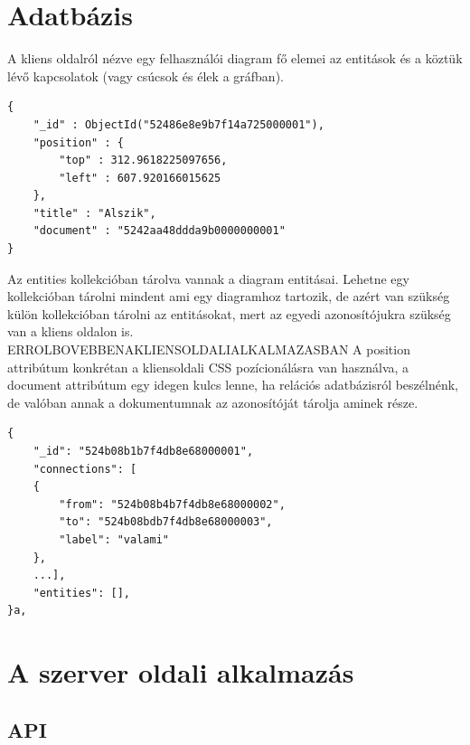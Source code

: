 \section{Adatbázis}

A kliens oldalról nézve egy felhasználói diagram fő elemei az entitások és a köztük lévő kapcsolatok (vagy csúcsok és élek a gráfban). 


\begin{lstlisting}
{
    "_id" : ObjectId("52486e8e9b7f14a725000001"),
    "position" : {
        "top" : 312.9618225097656,
        "left" : 607.920166015625
    },
    "title" : "Alszik",
    "document" : "5242aa48ddda9b0000000001"
}
\end{lstlisting}

Az entities kollekcióban tárolva vannak a diagram entitásai. Lehetne egy kollekcióban tárolni mindent ami egy diagramhoz tartozik, de azért van szükség külön kollekcióban tárolni az entitásokat, mert az egyedi azonosítójukra szükség van a kliens oldalon is. ERROLBOVEBBENAKLIENSOLDALIALKALMAZASBAN
A position attribútum konkrétan a kliensoldali CSS pozícionálásra van használva, a document attribútum egy idegen kulcs lenne, ha relációs adatbázisról beszélnénk, de valóban annak a dokumentumnak az azonosítóját tárolja aminek része.

\begin{lstlisting}
{
    "_id": "524b08b1b7f4db8e68000001",
    "connections": [
    {
        "from": "524b08b4b7f4db8e68000002",
        "to": "524b08bdb7f4db8e68000003",
        "label": "valami"
    },
    ...],
    "entities": [],
}a,
\end{lstlisting}


\section{A szerver oldali alkalmazás}

\subsection{API}


